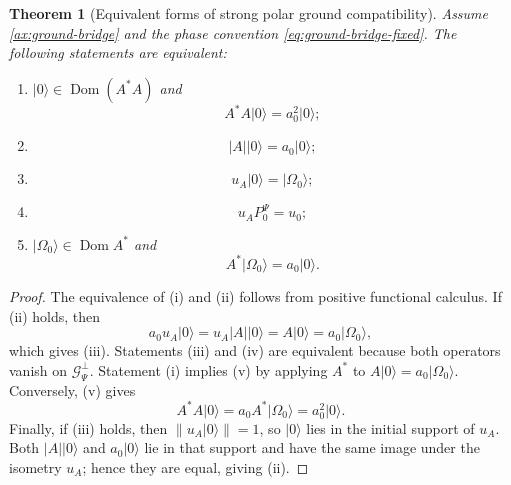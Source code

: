 \documentclass[11pt,reqno]{scrartcl}
\newcommand{\PzeroP}{P_{0}^{\Psi}}
\newcommand{\GzeroP}{\mathscr G_{\Psi}}
\newcommand{\polA}{u_A}
\newcommand{\absA}{|A|}
\newcommand{\uzero}{u_{0}}
\newcommand{\ket}[1]{\lvert #1\rangle}
\DeclareMathOperator{\Dom}{Dom}
\theoremstyle{plain}
\newtheorem{theorem}{Theorem}[section]
\theoremstyle{definition}
\theoremstyle{remark}
\begin{document}
\begin{theorem}[Equivalent forms of strong polar ground compatibility]
\label{thm:strong-ground-equivalences}
Assume \cref{ax:ground-bridge} and the phase convention
\eqref{eq:ground-bridge-fixed}.  The following statements are
equivalent:
\begin{enumerate}[label=(\roman*)]
  \item \(\ket0\in\Dom(A^*A)\) and
  \begin{equation}
    A^*A\ket0=a_0^2\ket0;
  \end{equation}
  \item
  \begin{equation}
    \absA\ket0=a_0\ket0;
  \end{equation}
  \item
  \begin{equation}
    \polA\ket0=\ket{\Omega_0};
  \end{equation}
  \item
  \begin{equation}
    \polA\PzeroP=\uzero;
  \end{equation}
  \item \(\ket{\Omega_0}\in\Dom A^*\) and
  \begin{equation}
    A^*\ket{\Omega_0}=a_0\ket0.
  \end{equation}
\end{enumerate}
\end{theorem}

\begin{proof}
The equivalence of (i) and (ii) follows from positive functional calculus.
If (ii) holds, then
\begin{equation}
  a_0\polA\ket0
  =\polA\absA\ket0
  =A\ket0
  =a_0\ket{\Omega_0},
\end{equation}
which gives (iii).  Statements (iii) and (iv) are equivalent because both
operators vanish on \(\GzeroP^\perp\).  Statement (i) implies (v) by applying
\(A^*\) to \(A\ket0=a_0\ket{\Omega_0}\).  Conversely, (v) gives
\begin{equation}
  A^*A\ket0
  =a_0A^*\ket{\Omega_0}
  =a_0^2\ket0.
\end{equation}
Finally, if (iii) holds, then \(\|\polA\ket0\|=1\), so \(\ket0\) lies in
the initial support of \(\polA\).  Both \(\absA\ket0\) and
\(a_0\ket0\) lie in that support and have the same image under the isometry
\(\polA\); hence they are equal, giving (ii).
\end{proof}
\end{document}
